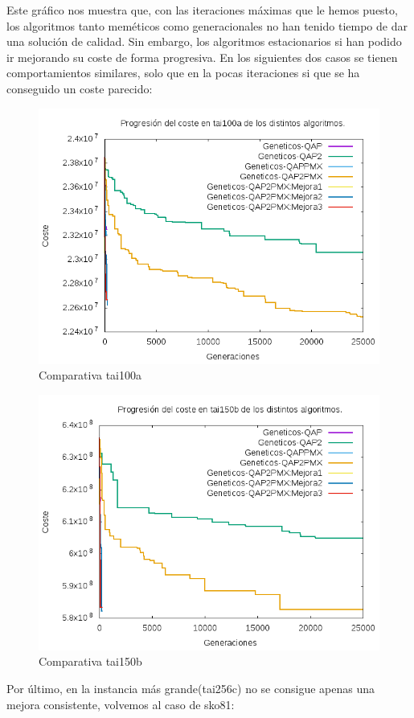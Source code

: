 Este gráfico nos muestra que, con las iteraciones máximas que le hemos puesto, los algoritmos tanto meméticos como generacionales no han tenido tiempo de dar una solución de calidad. Sin embargo, los algoritmos estacionarios si han podido ir mejorando su coste de forma progresiva. En los siguientes dos casos se tienen comportamientos similares, solo que en la pocas iteraciones si que se ha conseguido un coste parecido:\\

\begin{figure}[H]
	\centering
	\includegraphics[width=0.7\linewidth]{graficos/comparativatai100a}
	\caption[Comparativa tai100a]{Comparativa tai100a}
	\label{fig:comparativatai100a}
\end{figure}

\begin{figure}[H]
	\centering
	\includegraphics[width=0.7\linewidth]{graficos/comparativatai150b}
	\caption[Comparativa tai150b]{Comparativa tai150b}
	\label{fig:comparativatai150b}
\end{figure}

Por último, en la instancia más grande(tai256c) no se consigue apenas una mejora consistente, volvemos al caso de  sko81:\\

